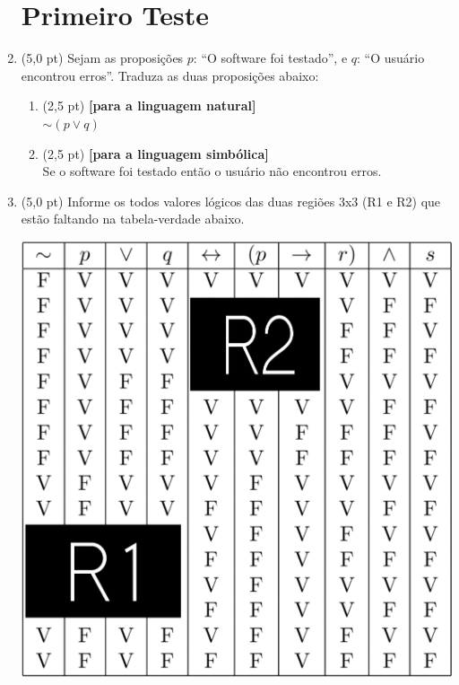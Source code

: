 \documentclass[12pt,a4paper,oneside]{article}
\begin{document}
\begin{enumerate}
	
	\section*{Primeiro Teste}
	
	\item (5,0 pt) Sejam as proposições $p$: ``O software foi testado'', e $q$: ``O usuário encontrou erros''. Traduza as duas proposições abaixo:
	\begin{enumerate}
		\item (2,5 pt) {\bf [para a linguagem natural]} \\$\sim (p \vee q)$
		\vspace*{0.3cm}
		
		\item (2,5 pt) {\bf [para a linguagem simbólica]} \\Se o software foi testado então o usuário não encontrou erros.
	\end{enumerate}
	
	
	\item (5,0 pt) Informe os todos valores lógicos das duas regiões 3x3 (R1 e R2) que estão faltando na tabela-verdade abaixo.
		\begin{center}
			\includegraphics[width=\textwidth]{images/tv-regiao-2.png}
		\end{center}
	

\end{enumerate}
\end{document}
